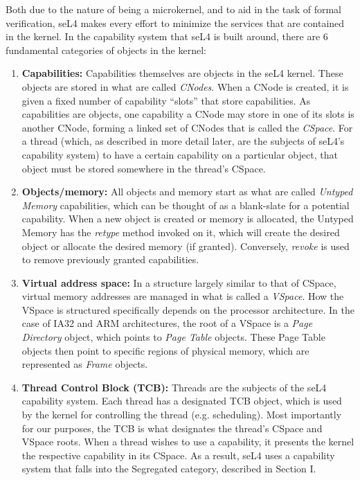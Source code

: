 Both due to the nature of being a microkernel, and to aid in the task of formal verification, seL4 makes every effort to minimize the services that are contained in the kernel. In the capability system that seL4 is built around, there are 6 fundamental categories of objects in the kernel:~\cite{kuz2010, sewell2011}
\begin{enumerate}
\item {\bf Capabilities:} Capabilities themselves are objects in the seL4 kernel. These objects are stored in what are called {\em CNodes}. When a CNode is created, it is given a fixed number of capability ``slots'' that store capabilities. As capabilities are objects, one capability a CNode may store in one of its slots is another CNode, forming a linked set of CNodes that is called the {\em CSpace}. For a thread (which, as described in more detail later, are the subjects of seL4's capability system) to have a certain capability on a particular object, that object must be stored somewhere in the thread's CSpace.
\item {\bf Objects/memory:} All objects and memory start as what are called {\em Untyped Memory} capabilities, which can be thought of as a blank-slate for a potential capability. When a new object is created or memory is allocated, the Untyped Memory has the {\em retype} method invoked on it, which will create the desired object or allocate the desired memory (if granted). Conversely, {\em revoke} is used to remove previously granted capabilities.
\item {\bf Virtual address space:} In a structure largely similar to that of CSpace, virtual memory addresses are managed in what is called a {\em VSpace}. How the VSpace is structured specifically depends on the processor architecture. In the case of IA32 and ARM architectures, the root of a VSpace is a {\em Page Directory} object, which points to {\em Page Table} objects. These Page Table objects then point to specific regions of physical memory, which are represented as {\em Frame} objects.
\item {\bf Thread Control Block (TCB):} Threads are the subjects of the seL4 capability system. Each thread has a designated TCB object, which is used by the kernel for controlling the thread (e.g. scheduling). Most importantly for our purposes, the TCB is what designates the thread's CSpace and VSpace roots. When a thread wishes to use a capability, it presents the kernel the respective capability in its CSpace. As a result, seL4 uses a capability system that falls into the Segregated category, described in Section I.

\end{enumerate}
